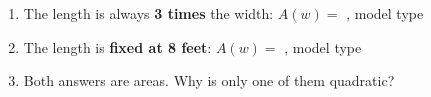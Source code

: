 \documentclass[10pt]{article}
\begin{document}
\begin{enumerate}[itemsep=10pt]
\begin{enumerate}[label=(\alph*), itemsep=4pt]
  \item The length is always \textbf{3 times} the width: \quad
        $A(w) = $ \blank{1.8cm}, \quad model type \blank{2.4cm}
  \item The length is \textbf{fixed at 8 feet}: \quad
        $A(w) = $ \blank{1.8cm}, \quad model type \blank{2.4cm}
  \item Both answers are areas. Why is only one of them quadratic?

        \writeline
\end{enumerate}

\end{enumerate}
\end{document}
